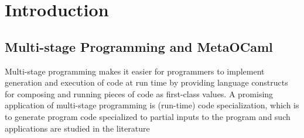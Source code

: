 
\section{Introduction}

\subsection{Multi-stage Programming and MetaOCaml}



Multi-stage programming makes it easier for programmers to implement
generation and execution of code at run time by providing language
constructs for composing and running pieces of code as first-class
values.  A promising application of multi-stage programming is
(run-time) code specialization, which is to generate program code
specialized to partial inputs to the program and such applications are
studied in the literature~\cite{taha2007gentle}  

